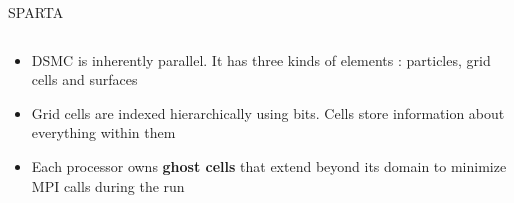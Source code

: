 \documentclass{beamer}
\begin{document}
\begin{frame}{SPARTA}
\begin{columns}
\begin{column}{0.5\linewidth}
\begin{itemize}
                        \item<1-> DSMC is inherently parallel. It has three kinds of elements : particles, grid cells and surfaces
                
                        \item<2-> Grid cells are indexed hierarchically using bits. Cells store information about everything within them
    
                        \item<3-> Each processor owns \textbf{ghost cells} that extend beyond its domain to minimize MPI calls during the run
                    \end{itemize}
                \end{column}
            \end{columns}
        \end{frame}
    
\end{document}
